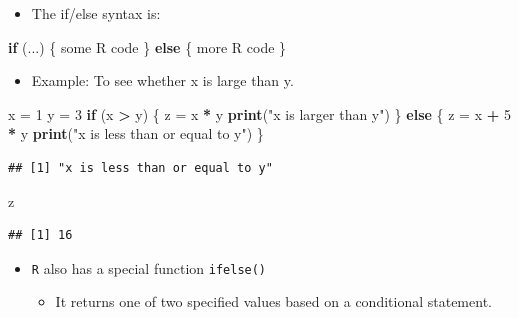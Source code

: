 \documentclass[]{book}
\newenvironment{Shaded}{\begin{snugshade}}{\end{snugshade}}
\newcommand{\KeywordTok}[1]{\textcolor[rgb]{0.13,0.29,0.53}{\textbf{#1}}}
\newcommand{\DecValTok}[1]{\textcolor[rgb]{0.00,0.00,0.81}{#1}}
\newcommand{\StringTok}[1]{\textcolor[rgb]{0.31,0.60,0.02}{#1}}
\newcommand{\ControlFlowTok}[1]{\textcolor[rgb]{0.13,0.29,0.53}{\textbf{#1}}}
\newcommand{\OperatorTok}[1]{\textcolor[rgb]{0.81,0.36,0.00}{\textbf{#1}}}
\newcommand{\NormalTok}[1]{#1}
\providecommand{\tightlist}{%
  \setlength{\itemsep}{0pt}\setlength{\parskip}{0pt}}
\begin{document}
\begin{itemize}
\tightlist
\item
  The if/else syntax is:
\end{itemize}

\begin{Shaded}
\begin{Highlighting}[]
\ControlFlowTok{if}\NormalTok{ (...) \{}
\NormalTok{  some R code}
\NormalTok{\} }\ControlFlowTok{else}\NormalTok{ \{}
\NormalTok{  more R code}
\NormalTok{\}}
\end{Highlighting}
\end{Shaded}

\begin{itemize}
\tightlist
\item
  Example: To see whether x is large than y.
\end{itemize}

\begin{Shaded}
\begin{Highlighting}[]
\NormalTok{x =}\StringTok{ }\DecValTok{1}
\NormalTok{y =}\StringTok{ }\DecValTok{3}
\ControlFlowTok{if}\NormalTok{ (x }\OperatorTok{>}\StringTok{ }\NormalTok{y) \{}
\NormalTok{  z =}\StringTok{ }\NormalTok{x }\OperatorTok{*}\StringTok{ }\NormalTok{y}
  \KeywordTok{print}\NormalTok{(}\StringTok{"x is larger than y"}\NormalTok{)}
\NormalTok{\} }\ControlFlowTok{else}\NormalTok{ \{}
\NormalTok{  z =}\StringTok{ }\NormalTok{x }\OperatorTok{+}\StringTok{ }\DecValTok{5} \OperatorTok{*}\StringTok{ }\NormalTok{y}
  \KeywordTok{print}\NormalTok{(}\StringTok{"x is less than or equal to y"}\NormalTok{)}
\NormalTok{\}}
\end{Highlighting}
\end{Shaded}

\begin{verbatim}
## [1] "x is less than or equal to y"
\end{verbatim}

\begin{Shaded}
\begin{Highlighting}[]
\NormalTok{z}
\end{Highlighting}
\end{Shaded}

\begin{verbatim}
## [1] 16
\end{verbatim}

\begin{itemize}
\tightlist
\item
  \texttt{R} also has a special function \texttt{ifelse()}

  \begin{itemize}
  \tightlist
  \item
    It returns one of two specified values based on a conditional
    statement.
  \end{itemize}
\end{itemize}
\end{document}
